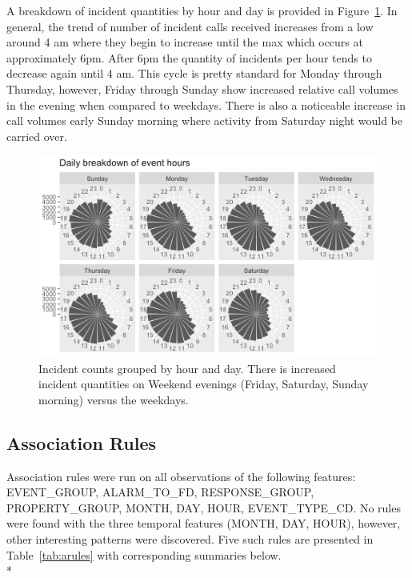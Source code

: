 \documentclass[12pt,letterpaper, oneside]
{article}
\begin{document}
A breakdown of incident quantities by hour and day is provided in Figure~\ref{fig:cox}. In general, the trend of number of incident calls received increases from a low around 4 am where they begin to increase until the max which occurs at approximately 6pm. After 6pm the quantity of incidents per hour tends to decrease again until 4 am. This cycle is pretty standard for Monday through Thursday, however, Friday through Sunday show increased relative call volumes in the evening when compared to weekdays. There is also a noticeable increase in call volumes early Sunday morning where activity from Saturday night would be carried over. 

\begin{figure}[h]
	\includegraphics[scale=0.6]{daily-hourly-coxwell-crop}
	\caption{Incident counts grouped by hour and day. There is increased incident quantities on Weekend evenings (Friday, Saturday, Sunday morning) versus the weekdays. 
	\label{fig:cox}}
\end{figure}

\subsection{Association Rules}

Association rules were run on all observations of the following features: \textsf{EVENT\_GROUP, ALARM\_TO\_FD, RESPONSE\_GROUP, PROPERTY\_GROUP, MONTH, DAY, HOUR, EVENT\_TYPE\_CD}. No rules were found with the three temporal features (\textsf{MONTH, DAY, HOUR}), however, other interesting patterns were discovered. Five such rules are presented in Table~\ref{tab:arules} with corresponding summaries below. \\*
\end{document}
